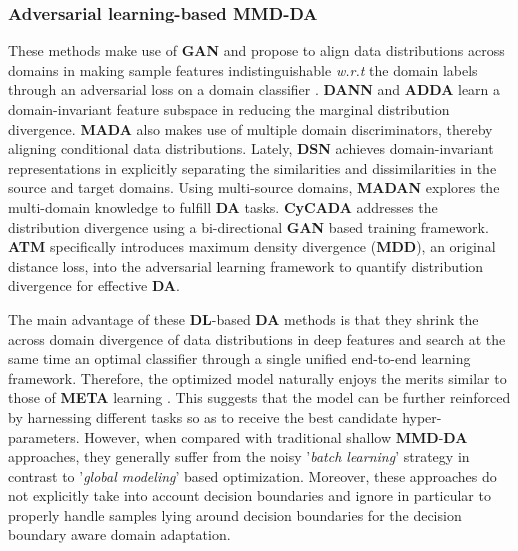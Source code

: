 \subsubsection{Adversarial learning-based MMD-DA}
\label{Adversarial loss-based DA}
These methods make use of \textbf{GAN} \cite{goodfellow2014generative} and propose to align data distributions across domains in making sample features indistinguishable \textit{w.r.t} the domain labels through an adversarial loss on a domain classifier \cite{ganin2016domain,tzeng2017adversarial,pei2018multi}. \textbf{DANN} \cite{ganin2016domain} and \textbf{ADDA}\cite{tzeng2017adversarial} learn a  domain-invariant feature subspace in reducing the marginal distribution divergence. \textbf{MADA} \cite{pei2018multi} also makes use of multiple domain discriminators, thereby aligning conditional data distributions. Lately, \textbf{DSN}\cite{bousmalis2016domain} achieves domain-invariant representations in explicitly separating the similarities and dissimilarities in the source and target domains. Using multi-source domains, \textbf{MADAN} \cite{zhao2019multi} explores the multi-domain knowledge to fulfill \textbf{DA} tasks. \textbf{CyCADA} \cite{pmlr-v80-hoffman18a} addresses the distribution divergence using a bi-directional \textbf{GAN} based training framework.  \textbf{ATM} \cite{li2020maximum} specifically introduces maximum density divergence  (\textbf{MDD}), an original distance loss, into the adversarial learning framework to quantify distribution divergence for effective \textbf{DA}.


The main advantage of these \textbf{DL}-based \textbf{DA} methods is that they  shrink the across domain divergence of data distributions in deep features  and search at the same time an optimal classifier through a single unified end-to-end learning framework. Therefore, the optimized model naturally enjoys the merits similar to those of \textbf{META} learning \cite{wei2021toalign}. This suggests that the model can be further reinforced by harnessing different tasks so as to receive the best candidate hyper-parameters. However, when compared with traditional shallow \textbf{MMD}-\textbf{DA} approaches, they generally suffer from the noisy '\textit{batch learning}' \cite{goodfellow2016deep} strategy in contrast to '\textit{global modeling}' \cite{belkin2003laplacian} based optimization. Moreover, these approaches do not explicitly take into account decision boundaries  and ignore in particular to properly handle samples lying around decision boundaries for the decision boundary aware domain adaptation.








